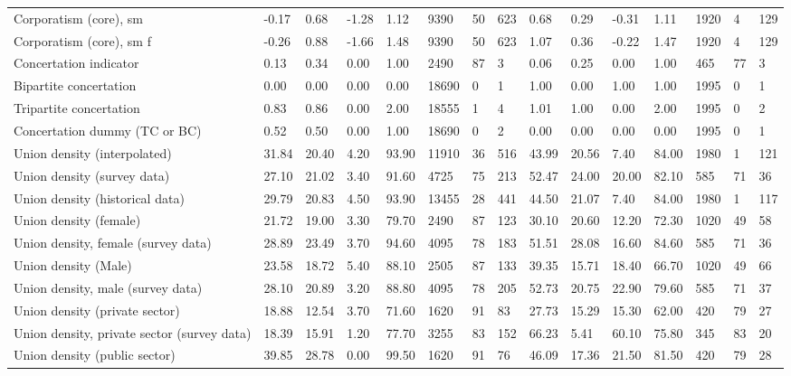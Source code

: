 \begin{longtable}{lllllllllllllll}
\addlinespace
Corporatism (core), sm & -0.17 & 0.68 & -1.28 & 1.12 & 9390 & 50 & 623 & 0.68 & 0.29 & -0.31 & 1.11 & 1920 & 4 & 129\\
Corporatism (core), sm f & -0.26 & 0.88 & -1.66 & 1.48 & 9390 & 50 & 623 & 1.07 & 0.36 & -0.22 & 1.47 & 1920 & 4 & 129\\
Concertation indicator & 0.13 & 0.34 & 0.00 & 1.00 & 2490 & 87 & 3 & 0.06 & 0.25 & 0.00 & 1.00 & 465 & 77 & 3\\
Bipartite concertation & 0.00 & 0.00 & 0.00 & 0.00 & 18690 & 0 & 1 & 1.00 & 0.00 & 1.00 & 1.00 & 1995 & 0 & 1\\
Tripartite concertation & 0.83 & 0.86 & 0.00 & 2.00 & 18555 & 1 & 4 & 1.01 & 1.00 & 0.00 & 2.00 & 1995 & 0 & 2\\
\addlinespace
Concertation dummy (TC or BC) & 0.52 & 0.50 & 0.00 & 1.00 & 18690 & 0 & 2 & 0.00 & 0.00 & 0.00 & 0.00 & 1995 & 0 & 1\\
Union density (interpolated) & 31.84 & 20.40 & 4.20 & 93.90 & 11910 & 36 & 516 & 43.99 & 20.56 & 7.40 & 84.00 & 1980 & 1 & 121\\
Union density (survey data) & 27.10 & 21.02 & 3.40 & 91.60 & 4725 & 75 & 213 & 52.47 & 24.00 & 20.00 & 82.10 & 585 & 71 & 36\\
Union density (historical data) & 29.79 & 20.83 & 4.50 & 93.90 & 13455 & 28 & 441 & 44.50 & 21.07 & 7.40 & 84.00 & 1980 & 1 & 117\\
Union density (female) & 21.72 & 19.00 & 3.30 & 79.70 & 2490 & 87 & 123 & 30.10 & 20.60 & 12.20 & 72.30 & 1020 & 49 & 58\\
\addlinespace
Union density, female (survey data) & 28.89 & 23.49 & 3.70 & 94.60 & 4095 & 78 & 183 & 51.51 & 28.08 & 16.60 & 84.60 & 585 & 71 & 36\\
Union density (Male) & 23.58 & 18.72 & 5.40 & 88.10 & 2505 & 87 & 133 & 39.35 & 15.71 & 18.40 & 66.70 & 1020 & 49 & 66\\
Union density, male (survey data) & 28.10 & 20.89 & 3.20 & 88.80 & 4095 & 78 & 205 & 52.73 & 20.75 & 22.90 & 79.60 & 585 & 71 & 37\\
Union density (private sector) & 18.88 & 12.54 & 3.70 & 71.60 & 1620 & 91 & 83 & 27.73 & 15.29 & 15.30 & 62.00 & 420 & 79 & 27\\
Union density, private sector (survey data) & 18.39 & 15.91 & 1.20 & 77.70 & 3255 & 83 & 152 & 66.23 & 5.41 & 60.10 & 75.80 & 345 & 83 & 20\\
\addlinespace
Union density (public sector) & 39.85 & 28.78 & 0.00 & 99.50 & 1620 & 91 & 76 & 46.09 & 17.36 & 21.50 & 81.50 & 420 & 79 & 28\\

\end{longtable}
